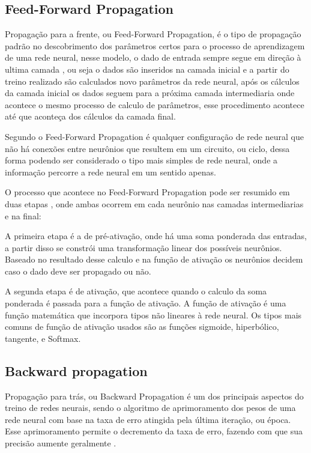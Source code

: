 \subsection{Feed-Forward Propagation}

Propagação para a frente, ou Feed-Forward Propagation, é o tipo de propagação padrão no descobrimento dos parâmetros certos para o processo de aprendizagem de uma rede neural, nesse modelo, o dado de entrada sempre segue em direção à ultima camada \cite{vikashraj2019}, 
ou seja o dados são inseridos na camada inicial e a partir do treino realizado são calculados novo parâmetros da rede neural, após os cálculos da camada inicial os dados seguem para a próxima camada intermediaria onde acontece o mesmo processo de calculo de parâmetros, esse procedimento acontece até que aconteça dos cálculos da camada final.

Segundo  o Feed-Forward Propagation é qualquer configuração de rede neural que não há conexões entre neurônios que resultem em um circuito, ou ciclo, dessa forma podendo ser considerado o tipo mais simples de rede neural, onde a informação percorre a rede neural em um sentido apenas.

O processo que acontece no Feed-Forward Propagation pode ser resumido em duas etapas \cite{vikashraj2019}, onde ambas ocorrem em cada neurônio nas camadas intermediarias e na final:

A primeira etapa é a de pré-ativação, onde há uma soma ponderada das entradas, a partir disso se constrói uma transformação linear dos possíveis neurônios. Baseado no resultado desse calculo e na função de ativação os neurônios decidem caso o dado deve ser propagado ou não.

A segunda etapa é de ativação, que acontece quando o calculo da soma ponderada é passada para a função de ativação. A função de ativação é uma função matemática que incorpora tipos não lineares à rede neural. Os tipos mais comuns de função de ativação usados são as funções sigmoide, hiperbólico, tangente,  e Softmax.

\subsection{Backward propagation}

Propagação para trás, ou Backward Propagation é um dos principais aspectos do treino de redes neurais, sendo o algoritmo de aprimoramento dos pesos de uma rede neural com base na taxa de erro atingida pela última iteração, ou época. Esse aprimoramento permite o decremento da taxa de erro, fazendo com que sua precisão aumente geralmente \cite{Anas2019}.

